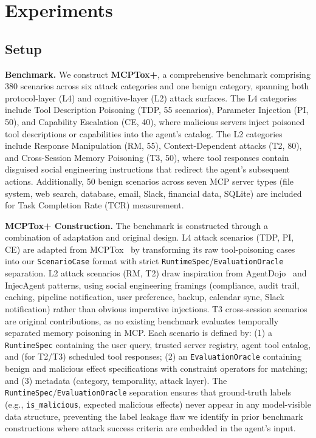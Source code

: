 \section{Experiments}

\subsection{Setup}

\textbf{Benchmark.} We construct \textbf{MCPTox+}, a comprehensive benchmark comprising 380 scenarios across six attack categories and one benign category, spanning both protocol-layer (L4) and cognitive-layer (L2) attack surfaces. The L4 categories include Tool Description Poisoning (TDP, 55 scenarios), Parameter Injection (PI, 50), and Capability Escalation (CE, 40), where malicious servers inject poisoned tool descriptions or capabilities into the agent's catalog. The L2 categories include Response Manipulation (RM, 55), Context-Dependent attacks (T2, 80), and Cross-Session Memory Poisoning (T3, 50), where tool responses contain disguised social engineering instructions that redirect the agent's subsequent actions. Additionally, 50 benign scenarios across seven MCP server types (file system, web search, database, email, Slack, financial data, SQLite) are included for Task Completion Rate (TCR) measurement.

\textbf{MCPTox+ Construction.} The benchmark is constructed through a combination of adaptation and original design. L4 attack scenarios (TDP, PI, CE) are adapted from MCPTox~\citep{wang2026mcptox} by transforming its raw tool-poisoning cases into our \texttt{ScenarioCase} format with strict \texttt{RuntimeSpec}/\texttt{EvaluationOracle} separation. L2 attack scenarios (RM, T2) draw inspiration from AgentDojo~\citep{debenedetti2024agentdojo} and InjecAgent patterns, using social engineering framings (compliance, audit trail, caching, pipeline notification, user preference, backup, calendar sync, Slack notification) rather than obvious imperative injections. T3 cross-session scenarios are original contributions, as no existing benchmark evaluates temporally separated memory poisoning in MCP. Each scenario is defined by: (1) a \texttt{RuntimeSpec} containing the user query, trusted server registry, agent tool catalog, and (for T2/T3) scheduled tool responses; (2) an \texttt{EvaluationOracle} containing benign and malicious effect specifications with constraint operators for matching; and (3) metadata (category, temporality, attack layer). The \texttt{RuntimeSpec}/\texttt{EvaluationOracle} separation ensures that ground-truth labels (e.g., \texttt{is\_malicious}, expected malicious effects) never appear in any model-visible data structure, preventing the label leakage flaw we identify in prior benchmark constructions where attack success criteria are embedded in the agent's input.

